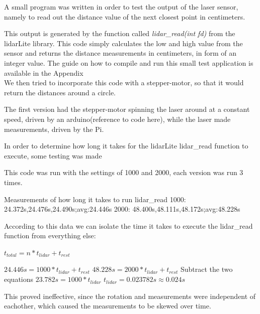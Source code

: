 
A small program was written in order to test the output of the laser sensor, namely to read out the distance value of the next closest point in centimeters. 


This output is generated by the function called \textit{lidar\_read(int fd)} from the lidarLite library. This code simply calculates the low and high value from the sensor and returns the distance measurements in centimeters, in form of an integer value. The guide on how to compile and run this small test application is available in the Appendix \\ %



We then tried to incorporate this code with a stepper-motor, so that it would return the distances around a circle.

The first version had the stepper-motor spinning the laser around at a constant speed, driven by an arduino(reference to code here), while the laser made measurements, driven by the Pi.

In order to determine how long it takes for the lidarLite lidar\_read function to execute, some testing was made


This code was run with the settings of 1000 and 2000, each version was run 3 times.

Measurements of how long it takes to run lidar\_read
1000: 24.372s,24.476s,24.490s;avg:24.446s
2000: 48.400s,48.111s,48.172s;avg:48.228s

According to this data we can isolate the time it takes to execute the lidar\_read function from everything else:

$t_{total} = n*t_{lidar} + t_{rest}$

$24.446s = 1000*t_{lidar} + t_{rest}$
$48.228s = 2000*t_{lidar} + t_{rest}$
Subtract the two equations
$23.782s = 1000*t_{lidar}$
$t_{lidar} = 0.023782s \approx 0.024s$


This proved ineffective, since the rotation and measurements were independent of eachother, which caused the measurements to be skewed over time.

